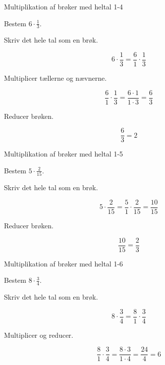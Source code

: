 \documentclass{article}
\begin{document}
\newpage

\begin{exercise}{Multiplikation af brøker med heltal 1-4}

Bestem $6 \cdot \frac{1}{3}$.


\hint

Skriv det hele tal som en brøk.

\hint
\[
6 \cdot \frac{1}{3} = \frac{6}{1} \cdot \frac{1}{3}
\]

\hint

Multiplicer tællerne og nævnerne.

\hint
\[
\frac{6}{1} \cdot \frac{1}{3} = \frac{6 \cdot 1}{1 \cdot 3} = \frac{6}{3}
\]

\hint

Reducer brøken.

\hint
\[
\frac{6}{3} = 2
\]

\end{exercise}

\newpage

\begin{exercise}{Multiplikation af brøker med heltal 1-5}

Bestem $5 \cdot \frac{2}{15}$.


\hint

Skriv det hele tal som en brøk.

\hint
\[
5 \cdot \frac{2}{15} = \frac{5}{1} \cdot \frac{2}{15} = \frac{10}{15}
\]

\hint

Reducer brøken.

\hint
\[
\frac{10}{15} = \frac{2}{3}
\]

\end{exercise}

\newpage

\begin{exercise}{Multiplikation af brøker med heltal 1-6}

Bestem $8 \cdot \frac{3}{4}$.


\hint

Skriv det hele tal som en brøk.

\hint
\[
8 \cdot \frac{3}{4} = \frac{8}{1} \cdot \frac{3}{4}
\]

\hint

Multiplicer og reducer.

\hint
\[
\frac{8}{1} \cdot \frac{3}{4} = \frac{8 \cdot 3}{1 \cdot 4} = \frac{24}{4} = 6
\]

\end{exercise}
\end{document}
